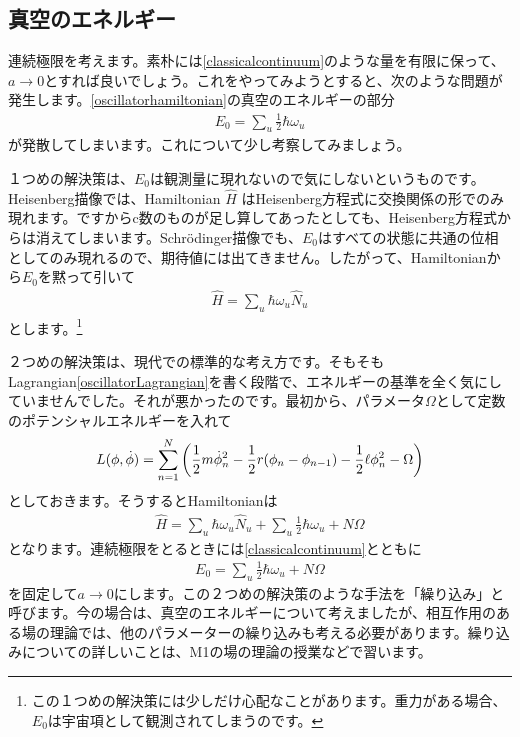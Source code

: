 \documentclass[report,paper=a4, fontsize=12pt, line_length=16cm, number_of_lines=33,dvipdfmx]{jlreq}
\numberwithin{equation}{chapter}
\newcommand{\Hh}{\widehat{H}}
\newcommand{\Nh}{\widehat{N}}
\begin{document}
\subsection{真空のエネルギー}
連続極限を考えます。素朴には\eqref{classicalcontinuum}のような量を有限に保って、$a\to 0$とすれば良いでしょう。これをやってみようとすると、次のような問題が発生します。\eqref{oscillatorhamiltonian}の真空のエネルギーの部分
\begin{align}
  E_0=\sum_{u}\frac12 \hbar \omega_{u}
\end{align}
が発散してしまいます。これについて少し考察してみましょう。

１つめの解決策は、$E_0$は観測量に現れないので気にしないというものです。Heisenberg描像では、Hamiltonian $\Hh$ はHeisenberg方程式に交換関係の形でのみ現れます。ですからc数のものが足し算してあったとしても、Heisenberg方程式からは消えてしまいます。Schrödinger描像でも、$E_0$はすべての状態に共通の位相としてのみ現れるので、期待値には出てきません。したがって、Hamiltonianから$E_0$を黙って引いて
\begin{align}
  \Hh=\sum_{u}\hbar \omega_{u}\Nh_{u}
\end{align}
とします。\footnote{この１つめの解決策には少しだけ心配なことがあります。重力がある場合、$E_0$は宇宙項として観測されてしまうのです。}

２つめの解決策は、現代での標準的な考え方です。そもそもLagrangian\eqref{oscillatorLagrangian}を書く段階で、エネルギーの基準を全く気にしていませんでした。それが悪かったのです。最初から、パラメータ$\Omega$として定数のポテンシャルエネルギーを入れて
\begin{align}
  L(\phi,\dot{\phi})=\sum_{n=1}^{N}\qty(
    \frac12 m \dot{\phi}_n^2-\frac12 r (\phi_n-\phi_{n-1})
    -\frac12 \ell \phi_n^2-\Omega
  )
\end{align}
としておきます。そうするとHamiltonianは
\begin{align}
  \Hh=\sum_{u}\hbar \omega_{u}\Nh_{u}+\sum_{u}\frac12 \hbar \omega_{u}+N\Omega
\end{align}
となります。連続極限をとるときには\eqref{classicalcontinuum}とともに
\begin{align}
  E_0=\sum_{u}\frac12\hbar\omega_{u}+N\Omega
\end{align}
を固定して$a\to 0$にします。この２つめの解決策のような手法を「繰り込み」と呼びます。今の場合は、真空のエネルギーについて考えましたが、相互作用のある場の理論では、他のパラメーターの繰り込みも考える必要があります。繰り込みについての詳しいことは、M1の場の理論の授業などで習います。
\end{document}

